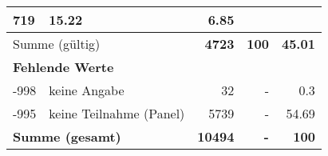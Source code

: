 \begin{longtable}{lXrrr}
       \num{719} &
       \num[round-mode=places,round-precision=2]{15,22} &
         \num[round-mode=places,round-precision=2]{6,85} \\
     \midrule
     \multicolumn{2}{l}{Summe (gültig)} &
       \textbf{\num{4723}} &
     \textbf{100} &
       \textbf{\num[round-mode=places,round-precision=2]{45,01}} \\
     \multicolumn{5}{l}{\textbf{Fehlende Werte}}\\
       -998 &
       keine Angabe &
         \num{32} &
        - &
         \num[round-mode=places,round-precision=2]{0,3} \\
       -995 &
       keine Teilnahme (Panel) &
         \num{5739} &
        - &
         \num[round-mode=places,round-precision=2]{54,69} \\
     \midrule
     \multicolumn{2}{l}{\textbf{Summe (gesamt)}} &
          \textbf{\num{10494}} &
        \textbf{-} &
        \textbf{100} \\
     \bottomrule
     \end{longtable}
     
